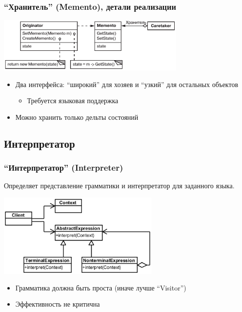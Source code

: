 \documentclass[xetex,mathserif,serif]{beamer}
\begin{document}
    \begin{frame}
        \frametitle{``Хранитель'' (Memento), детали реализации}
        \begin{center}
            \includegraphics[width=0.7\textwidth]{memento.png}
        \end{center}
        \begin{itemize}
            \item Два интерфейса: ``широкий'' для хозяев и ``узкий'' для остальных объектов
            \begin{itemize}
                \item Требуется языковая поддержка
            \end{itemize}
            \item Можно хранить только дельты состояний
        \end{itemize}
    \end{frame}

    \subsection{Интерпретатор}

    \begin{frame}
        \frametitle{``Интерпретатор'' (Interpreter)}
        Определяет представление грамматики и интерпретатор для заданного языка.
        \begin{center}
            \includegraphics[width=0.6\textwidth]{interpreter.png}
        \end{center}
        \begin{itemize}
            \item Грамматика должна быть проста (иначе лучше ``Visitor'')
            \item Эффективность не критична
        \end{itemize}
    \end{frame}
\end{document}

